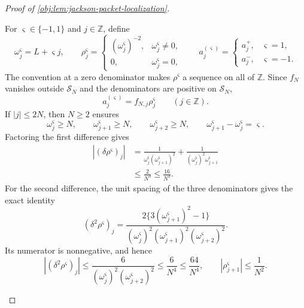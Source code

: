 \begin{proof}[Proof of \cref{obj:lem:jackson-packet-localization}]
\begin{enumerate}
For \(\varsigma\in\{-1,1\}\) and \(j\in\mathbb Z\), define
\[
\omega_j^{\varsigma}=L+\varsigma j,\qquad
\rho_j^{\varsigma}=
\begin{cases}
(\omega_j^{\varsigma})^{-2},&\omega_j^{\varsigma}\neq0,\\
0,&\omega_j^{\varsigma}=0,
\end{cases}
\qquad
a_j^{(\varsigma)}=
\begin{cases}
a_j^+,&\varsigma=1,\\
a_j^-,&\varsigma=-1.
\end{cases}
\]
The convention at a zero denominator makes \(\rho^{\varsigma}\) a sequence on all of \(\mathbb Z\). Since \(f_N\) vanishes outside \(\mathcal S_N\) and the denominators are positive on \(\mathcal S_N\),
\[
a_j^{(\varsigma)}=f_{N,j}\rho_j^{\varsigma}
\qquad(j\in\mathbb Z).
\]
If \(|j|\leq2N\), then \(N\geq2\) ensures
\[
\omega_j^{\varsigma}\geq N,\qquad
\omega_{j+1}^{\varsigma}\geq N,\qquad
\omega_{j+2}^{\varsigma}\geq N,
\qquad
\omega_{j+1}^{\varsigma}-\omega_j^{\varsigma}=\varsigma.
\]
Factoring the first difference gives
\[
\begin{aligned}
|(\delta\rho^{\varsigma})_j|
&=
\frac1{\omega_j^{\varsigma}(\omega_{j+1}^{\varsigma})^2}
+\frac1{(\omega_j^{\varsigma})^2\omega_{j+1}^{\varsigma}}\\
&\leq\frac2{N^3}\leq\frac{16}{N^3}.
\end{aligned}
\]
For the second difference, the unit spacing of the three denominators gives the exact identity
\[
(\delta^2\rho^{\varsigma})_j
=
\frac{2\{3(\omega_{j+1}^{\varsigma})^2-1\}}
 {(\omega_j^{\varsigma})^2
  (\omega_{j+1}^{\varsigma})^2
  (\omega_{j+2}^{\varsigma})^2}.
\]
Its numerator is nonnegative, and hence
\[
|(\delta^2\rho^{\varsigma})_j|
\leq
\frac6{(\omega_j^{\varsigma})^2(\omega_{j+2}^{\varsigma})^2}
\leq\frac6{N^4}\leq\frac{64}{N^4},
\qquad
|\rho_{j+1}^{\varsigma}|\leq\frac1{N^2}.
\]


\end{enumerate}
\end{proof}
